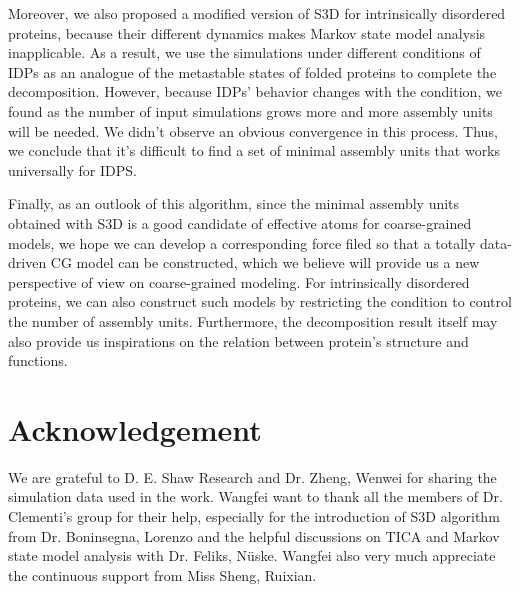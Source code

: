 \documentclass[12pt]{article}
\newcounter{lastnote}
\begin{document}
Moreover, we also proposed a modified version of S3D for intrinsically disordered proteins, because their different dynamics makes Markov state model analysis inapplicable. As a result, we use the simulations under different conditions of IDPs as an analogue of the metastable states of folded proteins to complete the decomposition. However, because IDPs' behavior changes with the condition, we found as the number of input simulations grows more and more assembly units will be needed. We didn't observe an obvious convergence in this process. Thus, we conclude that it's difficult to find a set of minimal assembly units that works universally for IDPS.

Finally, as an outlook of this algorithm, since the minimal assembly units obtained with S3D is a good candidate of effective atoms for coarse-grained models, we hope we can develop a corresponding force filed so that a totally data-driven CG model can be constructed, which we believe will provide us a new perspective of view on coarse-grained modeling. For intrinsically disordered proteins, we can also construct such models by restricting the condition to control the number of assembly units. Furthermore, the decomposition result itself may also provide us inspirations on the relation between protein's structure and functions.

\section*{Acknowledgement}

We are grateful to D. E. Shaw Research and Dr. Zheng, Wenwei for sharing the simulation data used in the work. Wangfei want to thank all the members of Dr. Clementi's group for their help, especially for the introduction of S3D algorithm from Dr. Boninsegna, Lorenzo and the helpful discussions on TICA and Markov state model analysis with Dr. Feliks, Nüske. Wangfei also very much appreciate the continuous support from Miss Sheng, Ruixian.

\clearpage






\end{document}
